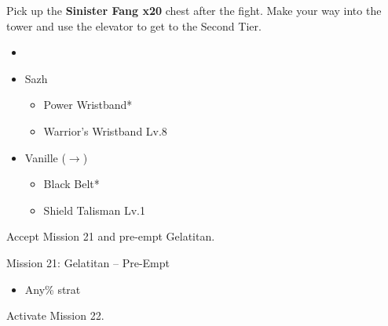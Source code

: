 Pick up the \textbf{Sinister Fang x20} chest after the fight.
Make your way into the tower and use the elevator to get to the Second Tier.

\begin{menu}
	\begin{itemize}
		\paradigm
		\begin{itemize}
			\item {}%
				  {\paradigmline{(\syn)}{\sab}{(\com)}}%
			      {\paradigmline{\com}{\rav}{\rav}}%
			      {\paradigmline[4]{\syn}{(\sab)}{(\rav)}}%
			      {\paradigmline{\com}{(\rav)}{\com}}%
			      {\paradigmline{\rav}{\sab}{(\rav)}}%
			      {\paradigmline{\com}{\med}{\com}}%
		\end{itemize}
		\equip
		\begin{itemize}
			\item Sazh
				\begin{itemize}
					\item Power Wristband*
					\item Warrior's Wristband Lv.8
				\end{itemize}
			\item Vanille ($\rightarrow$)
				\begin{itemize}
					\item Black Belt*
					\item Shield Talisman Lv.1
				\end{itemize}
		\end{itemize}
	\end{itemize}
\end{menu}

\renewcommand{\first}{[1] Bully (\syn/\sab/\com)}
\renewcommand{\second}{[2] Relentless Assault (\com/\rav/\rav)}
\renewcommand{\third}{[3] Guerilla (\syn/\sab/\rav)}
\renewcommand{\fourth}{[4] Aggression (\com/\rav/\com)}
\renewcommand{\fifth}{[5] Smart Bomb (\rav/\sab/\rav)}
\renewcommand{\sixth}{[6] Tireless Charge (\com/\med/\com)}

Accept Mission 21 and pre-empt Gelatitan.

\begin{battle}{Mission 21: Gelatitan -- Pre-Empt}
	\begin{itemize}
		\item Any\% strat
	\end{itemize}
\end{battle}

Activate Mission 22.

